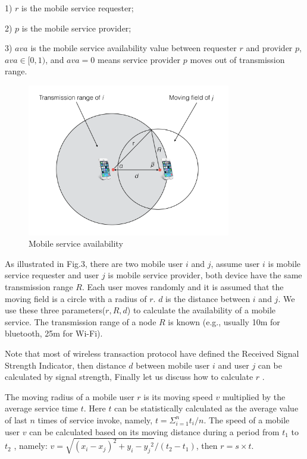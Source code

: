 \documentclass[10pt,journal,compsoc]{IEEEtran}
\begin{document}
​1) $r$ is the mobile service requester;

​2) $p$ is the mobile service provider;

​3) $ava$ is the mobile service availability value between requester $r$ and provider $p$, $ava \in [0,1)$, and $ava=0$ means service provider $p$ moves out of transmission range.


\begin{figure}[!t]
\centering
\includegraphics[width=3.5in]{./img/pic3.pdf}
\caption{Mobile service availability}
\label{fig_sd}
\end{figure}

As illustrated in Fig.3, there are two mobile user $i$ and $j$, assume user $i$ is mobile service requester and user $j$ is mobile service provider, both device have the same transmission range $R$. Each user moves randomly and it is assumed that the moving field is a circle with a radius of $r$. $d$ is the distance between $i$ and $j$. We use these three parameters($r,R,d$) to calculate the availability of a mobile service. The transmission range of a node $R$ is known (e.g., usually 10m for bluetooth, 25m for Wi-Fi). 

Note that most of wireless transaction protocol have defined the Received Signal Strength Indicator, then distance $d$ between mobile user $i$ and user $j$ can be calculated by signal strength, Finally let us discuss how to calculate $r$ \cite{Yang2010}.


The moving radius of a mobile user $r$ is its moving speed $v$ multiplied by the average service time $t$. Here $t$ can be statistically calculated as the average value of last $n$ times of service invoke, namely, $t = \Sigma_{i=1}^{n}t_i/n$. The speed of a mobile user $v$ can be calculated based on its moving distance during a period from $t_1$ to $t_2$ \cite{ko2000location}, namely: $v = \sqrt{{(x_i-x_j)^2}+{y_i-y_j}^2}/(t_2-t_1)$, then $r = s \times t$.
\end{document}
